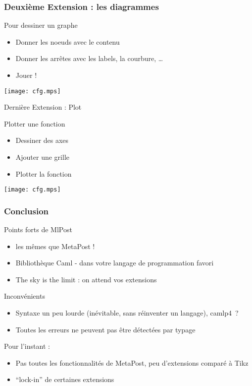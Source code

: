 \documentclass[nodefaultblocks]{beamer}
\begin{document}
\begin{frame}\frametitle{Deuxième Extension : les diagrammes}
  \begin{block}{Pour dessiner un graphe}
    \begin{itemize}
      \item Donner les noeuds avec le contenu
      \item Donner les arrêtes avec les labels, la courbure, \ldots
      \item Jouer ! 
    \end{itemize}
  \end{block}
  \begin{center}
    \texttt{[image: cfg.mps]}
  \end{center}
\end{frame}

\begin{frame}{Dernière Extension : Plot}
  \begin{block}{Plotter une fonction}
    \begin{itemize}
      \item Dessiner des axes
      \item Ajouter une grille
      \item Plotter la fonction 
    \end{itemize}
  \end{block}
  \begin{center}
    \texttt{[image: cfg.mps]}
  \end{center}
\end{frame}

\begin{frame}\frametitle{Conclusion}

  \begin{block}{Points forts de MlPost}
    \begin{itemize}
      \item les mêmes que MetaPost ! 
      \item Bibliothèque Caml - dans votre langage de programmation favori
      \item The sky is the limit : on attend vos extensions
    \end{itemize}
  \end{block}
  
  \begin{block}{Inconvénients}
    \begin{itemize}
      \item Syntaxe un peu lourde (inévitable, sans réinventer un langage),
        camlp4~?
      \item Toutes les erreurs ne peuvent pas être détectées par typage
    \end{itemize}
    Pour l'instant :
    \begin{itemize}
      \item Pas toutes les fonctionnalités de MetaPost, peu d'extensions
        comparé à Tikz
      \item ``lock-in'' de certaines extensions
    \end{itemize}
  \end{block}
\end{frame}
\end{document}
